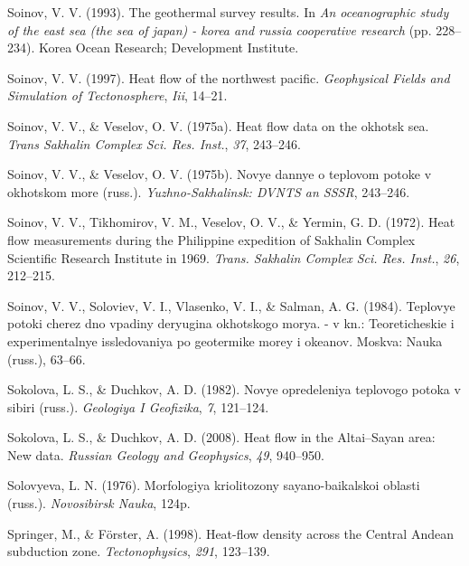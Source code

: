 \begin{CSLReferences}{1}{1}
\leavevmode{}%
Soinov, V. V. (1993). The geothermal survey results. In \emph{An oceanographic study of the east sea (the sea of japan) - korea and russia cooperative research} (pp. 228--234). Korea Ocean Research; Development Institute.

\leavevmode{}%
Soinov, V. V. (1997). Heat flow of the northwest pacific. \emph{Geophysical Fields and Simulation of Tectonosphere}, \emph{Iii}, 14--21.

\leavevmode{}%
Soinov, V. V., \& Veselov, O. V. (1975a). Heat flow data on the okhotsk sea. \emph{Trans Sakhalin Complex Sci. Res. Inst.}, \emph{37}, 243--246.

\leavevmode{}%
Soinov, V. V., \& Veselov, O. V. (1975b). Novye dannye o teplovom potoke v okhotskom more (russ.). \emph{Yuzhno-Sakhalinsk: DVNTS an SSSR}, 243--246.

\leavevmode{}%
Soinov, V. V., Tikhomirov, V. M., Veselov, O. V., \& Yermin, G. D. (1972). Heat flow measurements during the {Philippine} expedition of {Sakhalin Complex Scientific Research Institute} in 1969. \emph{Trans. Sakhalin Complex Sci. Res. Inst.}, \emph{26}, 212--215.

\leavevmode{}%
Soinov, V. V., Soloviev, V. I., Vlasenko, V. I., \& Salman, A. G. (1984). Teplovye potoki cherez dno vpadiny deryugina okhotskogo morya. - v kn.: Teoreticheskie i experimentalnye issledovaniya po geotermike morey i okeanov. Moskva: Nauka (russ.), 63--66.

\leavevmode{}%
Sokolova, L. S., \& Duchkov, A. D. (1982). Novye opredeleniya teplovogo potoka v sibiri (russ.). \emph{Geologiya I Geofizika}, \emph{7}, 121--124.

\leavevmode{}%
Sokolova, L. S., \& Duchkov, A. D. (2008). Heat flow in the {Altai--Sayan} area: New data. \emph{Russian Geology and Geophysics}, \emph{49}, 940--950.

\leavevmode{}%
Solovyeva, L. N. (1976). Morfologiya kriolitozony sayano-baikalskoi oblasti (russ.). \emph{Novosibirsk Nauka}, 124p.

\leavevmode{}%
Springer, M., \& Förster, A. (1998). Heat-flow density across the {Central Andean} subduction zone. \emph{Tectonophysics}, \emph{291}, 123--139.


\end{CSLReferences}
